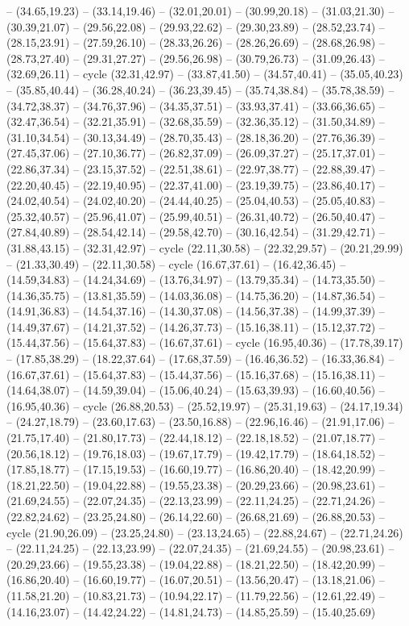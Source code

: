 {-- (34.65,19.23) -- (33.14,19.46) -- (32.01,20.01) -- (30.99,20.18) -- (31.03,21.30) -- (30.39,21.07) -- (29.56,22.08) -- (29.93,22.62) -- (29.30,23.89) -- (28.52,23.74) -- (28.15,23.91) -- (27.59,26.10) -- (28.33,26.26) -- (28.26,26.69) -- (28.68,26.98) -- (28.73,27.40) -- (29.31,27.27) -- (29.56,26.98) -- (30.79,26.73) -- (31.09,26.43) -- (32.69,26.11) -- cycle (32.31,42.97) -- (33.87,41.50) -- (34.57,40.41) -- (35.05,40.23) -- (35.85,40.44) -- (36.28,40.24) -- (36.23,39.45) -- (35.74,38.84) -- (35.78,38.59) -- (34.72,38.37) -- (34.76,37.96) -- (34.35,37.51) -- (33.93,37.41) -- (33.66,36.65) -- (32.47,36.54) -- (32.21,35.91) -- (32.68,35.59) -- (32.36,35.12) -- (31.50,34.89) -- (31.10,34.54) -- (30.13,34.49) -- (28.70,35.43) -- (28.18,36.20) -- (27.76,36.39) -- (27.45,37.06) -- (27.10,36.77) -- (26.82,37.09) -- (26.09,37.27) -- (25.17,37.01) -- (22.86,37.34) -- (23.15,37.52) -- (22.51,38.61) -- (22.97,38.77) -- (22.88,39.47) -- (22.20,40.45) -- (22.19,40.95) -- (22.37,41.00) -- (23.19,39.75) -- (23.86,40.17) -- (24.02,40.54) -- (24.02,40.20) -- (24.44,40.25) -- (25.04,40.53) -- (25.05,40.83) -- (25.32,40.57) -- (25.96,41.07) -- (25.99,40.51) -- (26.31,40.72) -- (26.50,40.47) -- (27.84,40.89) -- (28.54,42.14) -- (29.58,42.70) -- (30.16,42.54) -- (31.29,42.71) -- (31.88,43.15) -- (32.31,42.97) -- cycle (22.11,30.58) -- (22.32,29.57) -- (20.21,29.99) -- (21.33,30.49) -- (22.11,30.58) -- cycle (16.67,37.61) -- (16.42,36.45) -- (14.59,34.83) -- (14.24,34.69) -- (13.76,34.97) -- (13.79,35.34) -- (14.73,35.50) -- (14.36,35.75) -- (13.81,35.59) -- (14.03,36.08) -- (14.75,36.20) -- (14.87,36.54) -- (14.91,36.83) -- (14.54,37.16) -- (14.30,37.08) -- (14.56,37.38) -- (14.99,37.39) -- (14.49,37.67) -- (14.21,37.52) -- (14.26,37.73) -- (15.16,38.11) -- (15.12,37.72) -- (15.44,37.56) -- (15.64,37.83) -- (16.67,37.61) -- cycle (16.95,40.36) -- (17.78,39.17) -- (17.85,38.29) -- (18.22,37.64) -- (17.68,37.59) -- (16.46,36.52) -- (16.33,36.84) -- (16.67,37.61) -- (15.64,37.83) -- (15.44,37.56) -- (15.16,37.68) -- (15.16,38.11) -- (14.64,38.07) -- (14.59,39.04) -- (15.06,40.24) -- (15.63,39.93) -- (16.60,40.56) -- (16.95,40.36) -- cycle (26.88,20.53) -- (25.52,19.97) -- (25.31,19.63) -- (24.17,19.34) -- (24.27,18.79) -- (23.60,17.63) -- (23.50,16.88) -- (22.96,16.46) -- (21.91,17.06) -- (21.75,17.40) -- (21.80,17.73) -- (22.44,18.12) -- (22.18,18.52) -- (21.07,18.77) -- (20.56,18.12) -- (19.76,18.03) -- (19.67,17.79) -- (19.42,17.79) -- (18.64,18.52) -- (17.85,18.77) -- (17.15,19.53) -- (16.60,19.77) -- (16.86,20.40) -- (18.42,20.99) -- (18.21,22.50) -- (19.04,22.88) -- (19.55,23.38) -- (20.29,23.66) -- (20.98,23.61) -- (21.69,24.55) -- (22.07,24.35) -- (22.13,23.99) -- (22.11,24.25) -- (22.71,24.26) -- (22.82,24.62) -- (23.25,24.80) -- (26.14,22.60) -- (26.68,21.69) -- (26.88,20.53) -- cycle (21.90,26.09) -- (23.25,24.80) -- (23.13,24.65) -- (22.88,24.67) -- (22.71,24.26) -- (22.11,24.25) -- (22.13,23.99) -- (22.07,24.35) -- (21.69,24.55) -- (20.98,23.61) -- (20.29,23.66) -- (19.55,23.38) -- (19.04,22.88) -- (18.21,22.50) -- (18.42,20.99) -- (16.86,20.40) -- (16.60,19.77) -- (16.07,20.51) -- (13.56,20.47) -- (13.18,21.06) -- (11.58,21.20) -- (10.83,21.73) -- (10.94,22.17) -- (11.79,22.56) -- (12.61,22.49) -- (14.16,23.07) -- (14.42,24.22) -- (14.81,24.73) -- (14.85,25.59) -- (15.40,25.69) }
